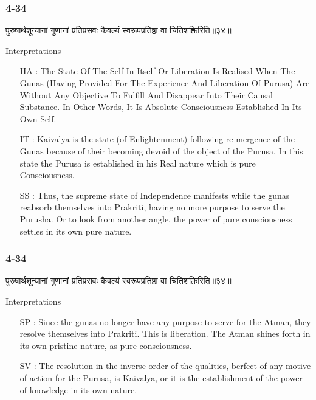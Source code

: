\begin{frame}[fragile]\frametitle{4-34}
\begin{sanskrit}
पुरुषार्थशून्यानां गुणानां प्रतिप्रसवः कैवल्यं स्वरूपप्रतिष्ठा वा चितिशक्तिरिति॥३४॥
\end{sanskrit}

Interpretations
\begin{itemize}	
\item [HA]: The State Of The Self In Itself Or Liberation Is Realised When The Gunas (Having Provided For The Experience And Liberation Of Purusa) Are Without Any Objective To Fulfill And Disappear Into Their Causal Substance. In Other Words, It Is Absolute Consciousness Established In Its Own Self.		
\item [IT]: Kaivalya is the state (of Enlightenment) following re-mergence of the Gunas because of their becoming devoid of the object of the Purusa. In this state the Purusa is established in his Real nature which is pure Consciousness.
\item [SS]: Thus, the supreme state of Independence manifests while the gunas reabsorb themselves into Prakriti, having no more purpose to serve the Purusha. Or to look from another angle, the power of pure consciousness settles in its own pure nature.
\end{itemize}
\end{frame}

\begin{frame}[fragile]\frametitle{4-34}
\begin{sanskrit}
पुरुषार्थशून्यानां गुणानां प्रतिप्रसवः कैवल्यं स्वरूपप्रतिष्ठा वा चितिशक्तिरिति॥३४॥
\end{sanskrit}

Interpretations
\begin{itemize}	
\item [SP]: Since the gunas no longer have any purpose to serve for the Atman, they resolve themselves into Prakriti. This is liberation. The Atman shines forth in its own pristine nature, as pure consciousness.
\item [SV]: The resolution in the inverse order of the qualities, berfect of any motive of action for the Purusa, is Kaivalya, or it is the establishment of the power of knowledge in its own nature. 
\end{itemize}
\end{frame}